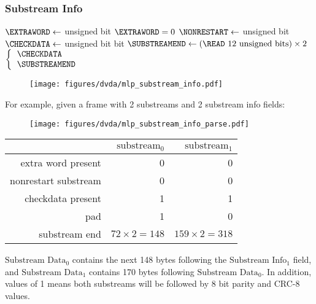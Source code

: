 \subsubsection{Substream Info}
\label{mlp:read_substream_info}
{
$\text{\EXTRAWORD} \leftarrow$  unsigned bit\;
\ASSERT $\text{\EXTRAWORD} = 0$\;
$\text{\NONRESTART} \leftarrow$  unsigned bit\;
$\text{\CHECKDATA} \leftarrow$  unsigned bit\;
 bit\;
$\text{\SUBSTREAMEND} \leftarrow (\text{\READ 12 unsigned bits}) \times 2$\;
\Return $\left\lbrace\begin{tabular}{l}
\CHECKDATA \\
\SUBSTREAMEND \\
\end{tabular}\right.$\;
\EALGORITHM
}
\begin{figure}[h]
  \texttt{[image: figures/dvda/mlp\_substream\_info.pdf]}
\end{figure}
\par
\noindent
For example, given a frame with 2 substreams
and 2 substream info fields:
\begin{figure}[h]
  \texttt{[image: figures/dvda/mlp\_substream\_info\_parse.pdf]}
\end{figure}
\begin{table}[h]
\begin{tabular}{rrr}
& $\text{substream}_0$ & $\text{substream}_1$ \\
\hline
extra word present & 0 & 0 \\
nonrestart substream & 0 & 0 \\
checkdata present & 1 & 1 \\
pad & 1 & 0 \\
substream end & $72 \times 2 = 148$ & $159 \times 2 = 318$ \\
\end{tabular}
\end{table}
\par
\noindent
$\text{Substream Data}_0$ contains
the next 148 bytes following the $\text{Substream Info}_1$ field,
and $\text{Substream Data}_1$ contains 170 bytes
following $\text{Substream Data}_0$.
In addition,  values of 1
means both substreams will be followed by 8 bit parity and CRC-8 values.

\clearpage

